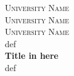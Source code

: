 \begin{titlepage}

\newcommand{\Hrule}[args][default]{def}

\centering %

\textsc{\LARGE University Name} \\[1.5cm] 
\textsc{\Large University Name} \\[1.5cm] 
\textsc{\large University Name} \\[1.5cm] 


\Hrule \\[0.4cm]
{\huge \bfseries Title in here}\\[0.4cm]
\Hrule \\[1.5cm]


\begin{minipage}

\end{minipage}


\end{titlepage}



